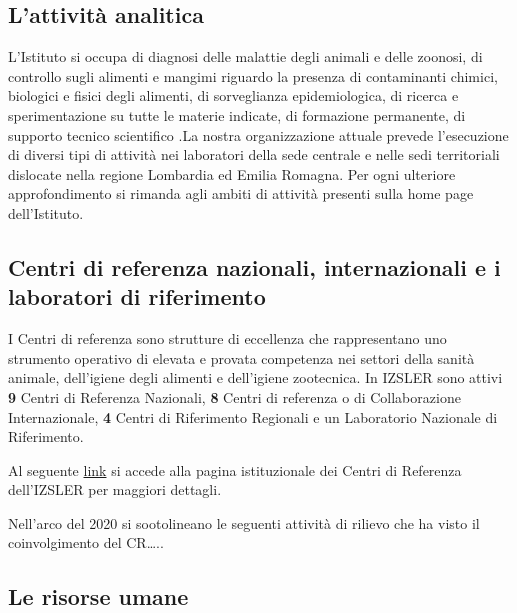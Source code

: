 \documentclass[
  12pt,
]{article}
\begin{document}
\hypertarget{lattivituxe0-analitica}{%
\subsection{L'attività analitica}\label{lattivituxe0-analitica}}

L'Istituto si occupa di diagnosi delle malattie degli animali e delle
zoonosi, di controllo sugli alimenti e mangimi riguardo la presenza di
contaminanti chimici, biologici e fisici degli alimenti, di sorveglianza
epidemiologica, di ricerca e sperimentazione su tutte le materie
indicate, di formazione permanente, di supporto tecnico scientifico .La
nostra organizzazione attuale prevede l'esecuzione di diversi tipi di
attività nei laboratori della sede centrale e nelle sedi territoriali
dislocate nella regione Lombardia ed Emilia Romagna. Per ogni ulteriore
approfondimento si rimanda agli ambiti di attività presenti sulla home
page dell'Istituto.

\hypertarget{centri-di-referenza-nazionali-internazionali-e-i-laboratori-di-riferimento}{%
\subsection{Centri di referenza nazionali, internazionali e i laboratori
di
riferimento}\label{centri-di-referenza-nazionali-internazionali-e-i-laboratori-di-riferimento}}

I Centri di referenza sono strutture di eccellenza che rappresentano uno
strumento operativo di elevata e provata competenza nei settori della
sanità animale, dell'igiene degli alimenti e dell'igiene zootecnica. In
IZSLER sono attivi \textbf{9} Centri di Referenza Nazionali, \textbf{8}
Centri di referenza o di Collaborazione Internazionale, \textbf{4}
Centri di Riferimento Regionali e un Laboratorio Nazionale di
Riferimento.

Al seguente
\href{https://www.izsler.it/chi-siamo/per-chi-e-con-chi-lavoriamo/centri-di-referenza/}{link}
si accede alla pagina istituzionale dei Centri di Referenza dell'IZSLER
per maggiori dettagli.

Nell'arco del 2020 si sootolineano le seguenti attività di rilievo che
ha visto il coinvolgimento del CR\ldots..

\hypertarget{le-risorse-umane}{%
\subsection{Le risorse umane}\label{le-risorse-umane}}
\end{document}
